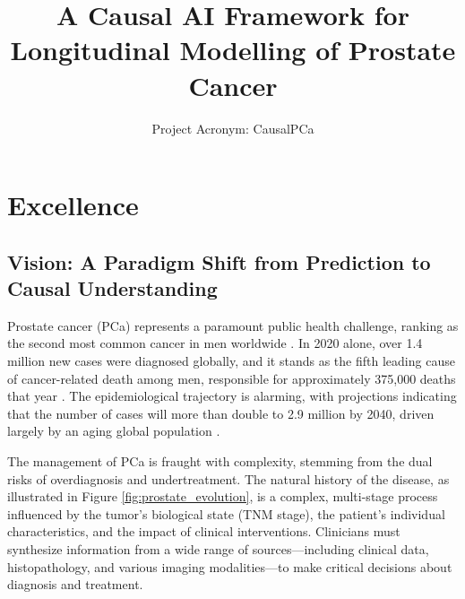 \documentclass[11pt, a4paper]{article}
\title{A Causal AI Framework for Longitudinal Modelling of Prostate Cancer}
\author{Project Acronym: CausalPCa}
\date{}
\begin{document}
\maketitle

\section{Excellence}

\subsection{Vision: A Paradigm Shift from Prediction to Causal Understanding}
Prostate cancer (PCa) represents a paramount public health challenge, ranking as the second most common cancer in men worldwide \cite{CaraccioloCastello2024,DulleaOSullivan2025}. In 2020 alone, over 1.4 million new cases were diagnosed globally, and it stands as the fifth leading cause of cancer-related death among men, responsible for approximately 375,000 deaths that year \cite{CereserEvangelista2023,GammelSolari2024,DharCendejasGomez2024}. The epidemiological trajectory is alarming, with projections indicating that the number of cases will more than double to 2.9 million by 2040, driven largely by an aging global population \cite{UdovicichJia2025,SungFerlay2021}.

The management of PCa is fraught with complexity, stemming from the dual risks of overdiagnosis and undertreatment. The natural history of the disease, as illustrated in Figure \ref{fig:prostate_evolution}, is a complex, multi-stage process influenced by the tumor's biological state (TNM stage), the patient's individual characteristics, and the impact of clinical interventions. Clinicians must synthesize information from a wide range of sources—including clinical data, histopathology, and various imaging modalities—to make critical decisions about diagnosis and treatment.
\end{document}
